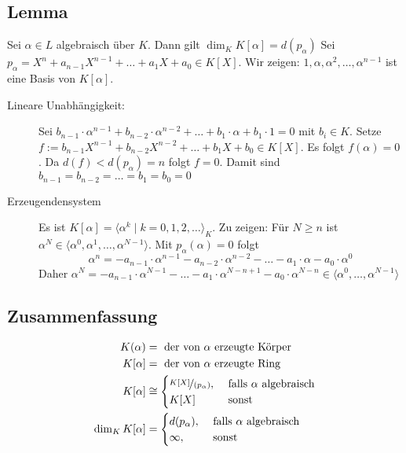 \subsection[{Lemma: Zusammenhang zwischen dem Grad von $K[\alpha]$ und $p_\alpha$}]{Lemma} %
\label{sub:1122}
Sei $\alpha \in L$ algebraisch über $K$. Dann gilt $\dim_K K[\alpha] = d(p_\alpha)$
Sei $p_\alpha = X^n + a_{n-1} X^{n-1} + \ldots + a_1 X + a_0 \in K[X]$. Wir zeigen: $1, \alpha, \alpha^2, \ldots , \alpha^{n-1}$ ist eine Basis von $K[\alpha]$.
\begin{description}
	\item[Lineare Unabhängigkeit:] Sei $b_{n-1} \cdot \alpha^{n-1} + b_{n-2}\cdot \alpha^{n-2}+ \ldots + b_1 \cdot \alpha + b_1 \cdot 1 =0$ mit $b_i \in K$.
	Setze $f := b_{n-1} X^{n-1}+ b_{n-2}X^{n-2} + \ldots + b_1 X + b_0 \in K[X]$. Es folgt $f(\alpha)=0$. Da $d(f) < d(p_\alpha) =n$ folgt $f=0$. Damit sind 
	$b_{n-1}=b_{n-2}= \ldots = b_1 =b_0=0$
	\item[Erzeugendensystem] Es ist $K[\alpha] = \langle \alpha^k \mid k=0,1,2, \ldots \rangle_K$.  Zu zeigen: Für $N\ge n$ ist 
	$\alpha^N \in \langle\alpha^0, \alpha^1, \ldots , \alpha^{N-1} \rangle$.
	Mit $p_\alpha(\alpha) =0$ folgt 
	\[
		\alpha^n = - a_{n-1}\cdot \alpha^{n-1} - a_{n-2}\cdot \alpha^{n-2}- \ldots  - a_1 \cdot \alpha - a_0 \cdot \alpha^0
	\]
	Daher $\alpha^N = - a_{n-1}\cdot \alpha^{N-1} - \ldots - a_1 \cdot \alpha^{N-n+1}- a_0 \cdot \alpha^{N-n} \in \langle \alpha^0, \ldots , \alpha^{N-1} \rangle$ \bewende
\end{description}

\subsection[Zusammenfassung des bisher gezeigten]{Zusammenfassung} %
\label{sub:1123}
\begin{align*}
	K(\alpha) &= \text{ der von $\alpha$ erzeugte Körper} \\
	K[\alpha] &= \text{ der von $\alpha$ erzeugte Ring} \\
	K[\alpha] &\cong \begin{cases}
		\nicefrac{K[X]}{(p_\alpha)}, &\text{ falls }\alpha \text{ algebraisch}\\
		K[X] &\text{ sonst}
	\end{cases} \\
	\dim_K K[\alpha] &= \begin{cases}
		d(p_\alpha), &\text{ falls }\alpha \text{ algebraisch}\\
		\infty ,&\text{ sonst}
	\end{cases}
\end{align*}


